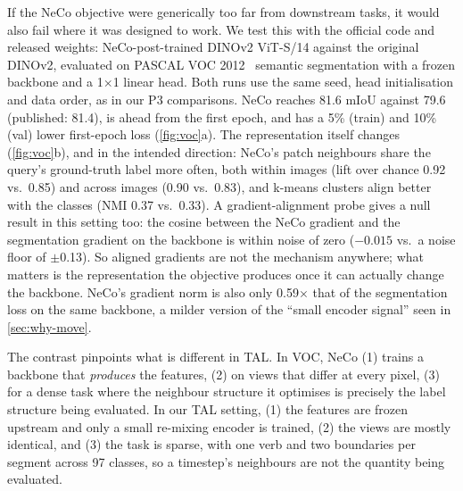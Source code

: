\documentclass[10pt,a4paper]{article}
\begin{document}
If the NeCo objective were generically too far from downstream tasks, it would also fail
where it was designed to work. We test this with the official code and released weights:
NeCo-post-trained DINOv2 ViT-S/14 against the original DINOv2, evaluated on PASCAL VOC
2012~\cite{everingham2010voc} semantic segmentation with a frozen backbone and a 1$\times$1
linear head. Both runs use the same seed, head initialisation and data order, as in our
P3 comparisons. NeCo reaches 81.6 mIoU against 79.6 (published: 81.4), is ahead from the
first epoch, and has a 5\% (train) and 10\% (val) lower first-epoch loss
(\cref{fig:voc}a). The representation itself changes (\cref{fig:voc}b), and in the
intended direction: NeCo's patch neighbours share the query's ground-truth label more
often, both within images (lift over chance 0.92 vs.\ 0.85) and across images (0.90 vs.\
0.83), and k-means clusters align better with the classes (NMI 0.37 vs.\ 0.33). A gradient-alignment
probe gives a null result in this setting too: the cosine between the NeCo gradient
and the segmentation gradient on the backbone is within noise of zero ($-0.015$ vs.\ a noise
floor of $\pm$0.13). So aligned gradients are not the mechanism anywhere; what matters is
the representation the objective produces once it can actually change the backbone. NeCo's
gradient norm is also only 0.59$\times$ that of the segmentation loss on the same backbone,
a milder version of the ``small encoder signal'' seen in \cref{sec:why-move}.

The contrast pinpoints what is different in TAL. In VOC, NeCo (1) trains a backbone that
\emph{produces} the features, (2) on views that differ at every pixel, (3) for a dense
task where the neighbour structure it optimises is precisely the label structure
being evaluated. In our TAL setting, (1) the features are frozen upstream and only a small
re-mixing encoder is trained, (2) the views are mostly identical, and (3) the task is
sparse, with one verb and two boundaries per segment across 97 classes, so a timestep's
neighbours are not the quantity being evaluated.
\end{document}

